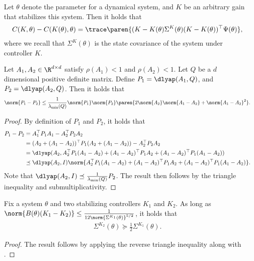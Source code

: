 

\begin{lemma}
    \label{lem: performance difference}
    Let $\theta$ denote the parameter for a dynamical system, and $K$ be an arbitrary gain that stabilizes this system. Then it holds that
    \begin{align*}
        C(K, \theta) - C(K(\theta), \theta) = \trace\paren{(K-K(\theta) \Sigma^K(\theta) (K-K(\theta))^\top \Psi(\theta)}, 
    \end{align*}
    where we recall that $\Sigma^K(\theta)$ is the state covariance of the system under controller $K$. 
\end{lemma}

\begin{lemma}
    \label{lem: lyap perturbation}
    Let $A_1, A_2 \in \R^{d \times d}$ satisfy  $\rho(A_1) < 1$ and $\rho(A_2) < 1$. Let $Q$ be a $d$ dimensional positive definite matrix. Define $P_1 = \dlyap(A_1, Q)$, and $P_2 = \dlyap(A_2, Q)$. Then it holds that 
    \begin{align*}
        \norm{P_1 - P_2} \leq \frac{1}{\lambda_{\min}(Q)}\norm{P_1} \norm{P_2}\paren{2\norm{A_2} \norm{A_1-A_2}+\norm{A_1 - A_2}^2}. 
    \end{align*}
\end{lemma}
\begin{proof}
    By definition of $P_1$ and $P_2$, it holds that 
    \begin{align*}
        P_1 - P_2 &= A_1^\top P_1 A_1 - A_2^\top P_2 A_2 \\
        &= (A_2 + (A_1-A_2))^\top P_1 (A_2 + (A_1-A_2)) - A_2^\top P_2 A_2 \\
        &= \dlyap(A_2, A_2^\top P_1 (A_1-A_2) +(A_1-A_2)^\top P_1 A_2 +  (A_1-A_2)^\top P_1(A_1-A_2)) \\
        &\preceq \dlyap(A_2, I) \norm{A_2^\top P_1 (A_1-A_2) +(A_1-A_2)^\top P_1 A_2 +  (A_1-A_2)^\top P_1(A_1-A_2)}.
    \end{align*}
    Note that $\dlyap(A_2, I)\preceq \frac{1}{\lambda_{\min}(Q)} P_2$. The result then follows by the triangle inequality and submultiplicativity.
\end{proof}

\begin{lemma}
    \label{lem: cov lower bound}
    Fix a system $\theta$ and two stabilizing controllers $K_1$ and $K_2$. As long as $\norm{B(\theta)(K_1 - K_2)} \leq \frac{1}{12 \norm{\Sigma^{K_1}(\theta)}^{5/2}}$, it holds that 
    \begin{align*}
        \Sigma^{K_2}(\theta) \succeq \frac{1}{2} \Sigma^{K_1}(\theta).
    \end{align*}
\end{lemma}
\begin{proof}
    The result follows by applying the reverse triangle inequality along with .
\end{proof}


